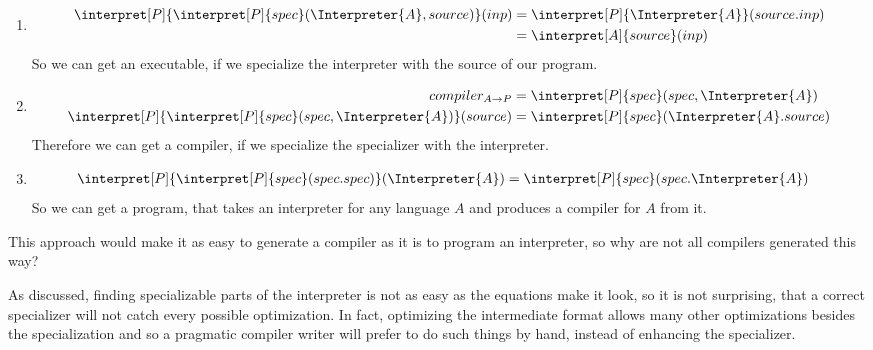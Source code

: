 \begin{enumerate}
	\item \begin{align*}
			\interpret[P]{\interpret[P]{spec}(\Interpreter{A}, source)}(inp)
			&= \interpret[P]{\Interpreter{A}}(source.inp) \\
			&= \interpret[A]{source}(inp)
	\end{align*}
		So we can get an executable, if we specialize the interpreter with the 
		source of our program.
	\item \begin{equation*}
			\begin{split}
			compiler_{A\rightarrow P} &= \interpret[P]{spec}(spec, \Interpreter{A}) \\
				\interpret[P]{\interpret[P]{spec}(spec, \Interpreter{A})}(source)
				&= \interpret[P]{spec}(\Interpreter{A}.source)
		\end{split}
	\end{equation*}
		Therefore we can get a compiler, if we specialize the specializer with the interpreter.
	\item \begin{align*}
			\interpret[P]{\interpret[P]{spec}(spec.spec)}(\Interpreter{A})
			&= \interpret[P]{spec}(spec.\Interpreter{A})
	\end{align*}
		So we can get a program, that takes an interpreter for any language $A$ 
		and produces a compiler for $A$ from it.
\end{enumerate}

This approach would make it as easy to generate a compiler as it is to 
program an interpreter, so why are not all compilers generated this way?

As discussed, finding specializable parts of the interpreter is not as easy 
as the equations make it look, so it is not surprising, that a correct 
specializer will not catch every possible optimization. In fact, optimizing 
the intermediate format allows many other optimizations besides the
specialization and so a pragmatic compiler writer will prefer to do such 
things by hand, instead of enhancing the specializer.



